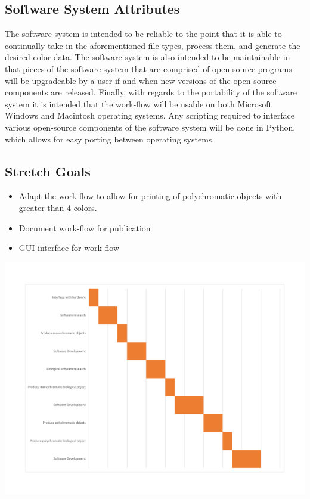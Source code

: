 \documentclass[letterpaper, onecolumn, draftclsnofoot, 10pt, compsoc]{IEEEtran}
\begin{document}
    \subsection{Software System Attributes}
    The software system is intended to be reliable to the point that it is able to continually take in the aforementioned file types, process them, and generate the desired color data. 
    The software system is also intended to be maintainable in that pieces of the software system that are comprised of open-source programs will be upgradeable by a user if and when new versions of the open-source components are released. 
    Finally, with regards to the portability of the software system it is intended that the work-flow will be usable on both Microsoft Windows and Macintosh operating systems. 
    Any scripting required to interface various open-source components of the software system will be done in Python, which allows for easy porting between operating systems. 
    
    \subsection{Stretch Goals}
    \begin{itemize}
    	\item Adapt the work-flow to allow for printing of polychromatic objects with greater than 4 colors.
        \item Document work-flow for publication
        \item GUI interface for work-flow
    \end{itemize}

\newpage
{}
  \begin{center}
  \includegraphics[width=7in]{gantt.pdf}
  \end{center}
\end{document}
